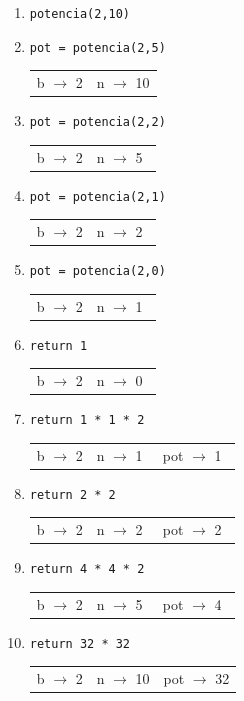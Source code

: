 \begin{enumerate}
\item \verb!potencia(2,10)!
\item \hspace{1cm} \verb!pot = potencia(2,5) !
\hspace{4cm} \begin{tabular}{|c|c|}b $\rightarrow$ 2 & n $\rightarrow$ 10\end{tabular}
\item \hspace{2cm} \verb!pot = potencia(2,2) !
\hspace{3cm} \begin{tabular}{|c|c|}b $\rightarrow$ 2 & n $\rightarrow$ 5$\;\,$\end{tabular}
\item \hspace{3cm} \verb!pot = potencia(2,1) !
\hspace{2cm} \begin{tabular}{|c|c|}b $\rightarrow$ 2 & n $\rightarrow$ 2$\;\,$\end{tabular}
\item \hspace{4cm} \verb!pot = potencia(2,0) !
\hspace{1cm} \begin{tabular}{|c|c|}b $\rightarrow$ 2 & n $\rightarrow$ 1$\;\,$\end{tabular}
\item \hspace{5cm} \verb!return 1            !
\hspace{0cm} \begin{tabular}{|c|c|}b $\rightarrow$ 2 & n $\rightarrow$ 0$\;\,$\end{tabular}
\item \hspace{4cm} \verb!return 1 * 1 * 2    !
\hspace{1cm} \begin{tabular}{|c|c|c|}b $\rightarrow$ 2 & n $\rightarrow$ 1$\;\,$
& pot $\rightarrow$ 1$\;\,$ \end{tabular}
\item \hspace{3cm} \verb!return 2 * 2        !
\hspace{2cm} \begin{tabular}{|c|c|c|}b $\rightarrow$ 2 & n $\rightarrow$ 2$\;\,$
& pot $\rightarrow$ 2$\;\,$ \end{tabular}
\item \hspace{2cm} \verb!return 4 * 4 * 2    !
\hspace{3cm} \begin{tabular}{|c|c|c|}b $\rightarrow$ 2 & n $\rightarrow$ 5$\;\,$
& pot $\rightarrow$ 4$\;\,$ \end{tabular}
\item \hspace{1cm} \verb!return 32 * 32      !
\hspace{4cm} \begin{tabular}{|c|c|c|}b $\rightarrow$ 2 & n $\rightarrow$ 10
& pot $\rightarrow$ 32 \end{tabular}
\end{enumerate}

